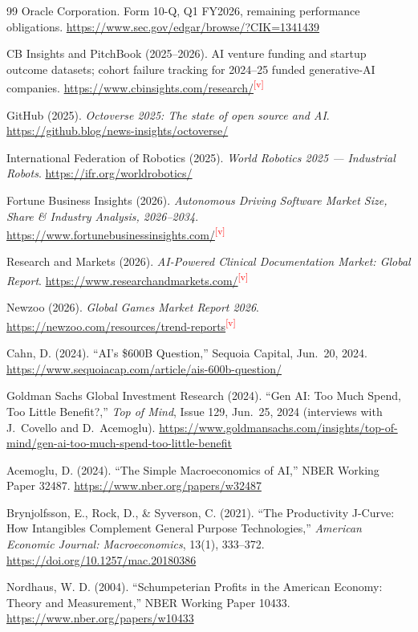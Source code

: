 \documentclass[11pt,letterpaper]{article}
\newcommand{\verify}{\textsuperscript{\textcolor{red}{[v]}}}
\begin{document}
\begin{thebibliography}{99}
Oracle Corporation. Form 10-Q, Q1 FY2026, remaining performance obligations. \url{https://www.sec.gov/edgar/browse/?CIK=1341439}

CB Insights and PitchBook (2025--2026). AI venture funding and startup outcome datasets; cohort failure tracking for 2024--25 funded generative-AI companies. \url{https://www.cbinsights.com/research/}\verify

GitHub (2025). \textit{Octoverse 2025: The state of open source and AI}. \url{https://github.blog/news-insights/octoverse/}

International Federation of Robotics (2025). \textit{World Robotics 2025 --- Industrial Robots}. \url{https://ifr.org/worldrobotics/}

Fortune Business Insights (2026). \textit{Autonomous Driving Software Market Size, Share \& Industry Analysis, 2026--2034}. \url{https://www.fortunebusinessinsights.com/}\verify

Research and Markets (2026). \textit{AI-Powered Clinical Documentation Market: Global Report}. \url{https://www.researchandmarkets.com/}\verify

Newzoo (2026). \textit{Global Games Market Report 2026}. \url{https://newzoo.com/resources/trend-reports}\verify

Cahn, D. (2024). ``AI's \$600B Question,'' Sequoia Capital, Jun.~20, 2024. \url{https://www.sequoiacap.com/article/ais-600b-question/}

Goldman Sachs Global Investment Research (2024). ``Gen AI: Too Much Spend, Too Little Benefit?,'' \textit{Top of Mind}, Issue 129, Jun.~25, 2024 (interviews with J.~Covello and D.~Acemoglu). \url{https://www.goldmansachs.com/insights/top-of-mind/gen-ai-too-much-spend-too-little-benefit}

Acemoglu, D. (2024). ``The Simple Macroeconomics of AI,'' NBER Working Paper 32487. \url{https://www.nber.org/papers/w32487}

Brynjolfsson, E., Rock, D., \& Syverson, C. (2021). ``The Productivity J-Curve: How Intangibles Complement General Purpose Technologies,'' \textit{American Economic Journal: Macroeconomics}, 13(1), 333--372. \url{https://doi.org/10.1257/mac.20180386}

Nordhaus, W. D. (2004). ``Schumpeterian Profits in the American Economy: Theory and Measurement,'' NBER Working Paper 10433. \url{https://www.nber.org/papers/w10433}


\end{thebibliography}
\end{document}
